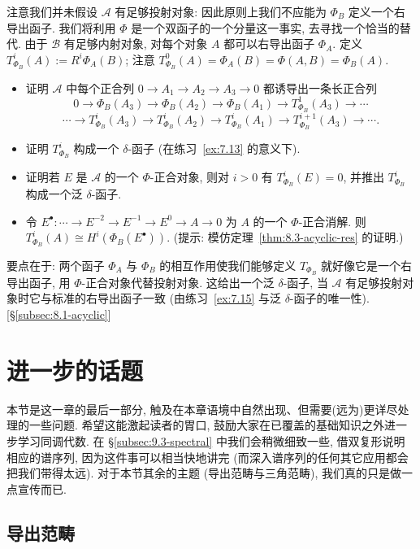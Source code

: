 \begin{prob}
注意我们并未假设 $\mathcal{A}$ 有足够投射对象: 因此原则上我们不应能为 $\Phi_B$ 定义一个右导出函子. 我们将利用 $\Phi$ 是一个双函子的一个分量这一事实, 去寻找一个恰当的替代. 由于 $\mathcal{B}$ 有足够内射对象, 对每个对象 $A$ 都可以右导出函子 $\Phi_A$. 定义 $T^i_{\Phi_B}(A):=R^i\Phi_A(B)$; 注意 $T^0_{\Phi_B}(A)=\Phi_A(B)=\Phi(A,B)=\Phi_B(A)$.
\begin{itemize}
\item 证明 $\mathcal{A}$ 中每个正合列 $0\to A_1\to A_2\to A_3\to 0$ 都诱导出一条长正合列
\[
0\longrightarrow \Phi_B(A_3)\longrightarrow \Phi_B(A_2)\longrightarrow \Phi_B(A_1)\longrightarrow T^1_{\Phi_B}(A_3)\longrightarrow \cdots
\]
\[
\cdots \longrightarrow T^i_{\Phi_B}(A_3)\longrightarrow T^i_{\Phi_B}(A_2)\longrightarrow T^i_{\Phi_B}(A_1)\longrightarrow T^{i+1}_{\Phi_B}(A_3)\longrightarrow \cdots .
\]
\item 证明 $T^i_{\Phi_B}$ 构成一个 $\delta$-函子 (在练习~\ref{ex:7.13} 的意义下).
\item 证明若 $E$ 是 $\mathcal{A}$ 的一个 $\Phi$-正合对象, 则对 $i>0$ 有 $T^i_{\Phi_B}(E)=0$, 并推出 $T^i_{\Phi_B}$ 构成一个泛 $\delta$-函子.
\item 令 $E^\bullet:\cdots\to E^{-2}\to E^{-1}\to E^0\to A\to 0$ 为 $A$ 的一个 $\Phi$-正合消解. 则 $T^i_{\Phi_B}(A)\cong H^i(\Phi_B(E^\bullet))$. (提示: 模仿定理~\ref{thm:8.3-acyclic-res} 的证明.)
\end{itemize}
要点在于: 两个函子 $\Phi_A$ 与 $\Phi_B$ 的相互作用使我们能够定义 $T_{\Phi_B}$ 就好像它是一个右导出函子, 用 $\Phi$-正合对象代替投射对象. 这给出一个泛 $\delta$-函子, 当 $\mathcal{A}$ 有足够投射对象时它与标准的右导出函子一致 (由练习~\ref{ex:7.15} 与泛 $\delta$-函子的唯一性). [\S\ref{subsec:8.1-acyclic}]
\end{prob}

\section{进一步的话题}
\label{sec:further-topics}

本节是这一章的最后一部分, 触及在本章语境中自然出现、但需要(远为)更详尽处理的一些问题. 希望这能激起读者的胃口, 鼓励大家在已覆盖的基础知识之外进一步学习同调代数. 在 \S\ref{subsec:9.3-spectral} 中我们会稍微细致一些, 借双复形说明相应的谱序列, 因为这件事可以相当快地讲完 (而深入谱序列的任何其它应用都会把我们带得太远). 对于本节其余的主题 (导出范畴与三角范畴), 我们真的只是做一点宣传而已.

\subsection{导出范畴}\label{subsec:9.1-derived}

